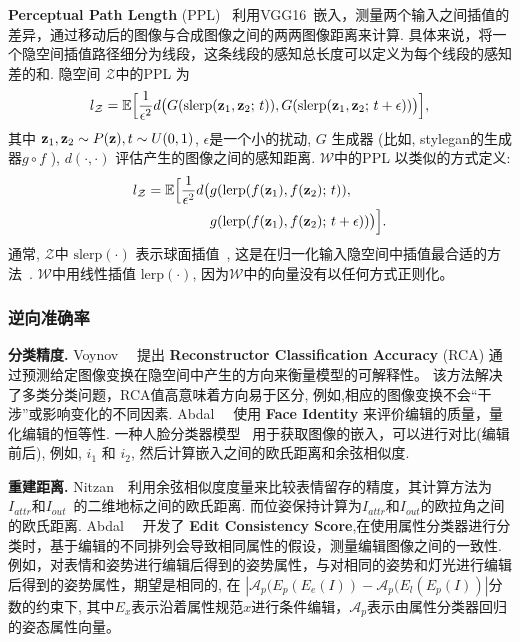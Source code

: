 \vspace{1mm}
\noindent\textbf{Perceptual Path Length} (PPL)~\cite{karras2019style} 利用VGG16~\cite{simonyan2014very}嵌入，测量两个输入之间插值的差异，通过移动后的图像与合成图像之间的两两图像距离来计算.
具体来说，将一个隐空间插值路径细分为线段，这条线段的感知总长度可以定义为每个线段的感知差的和.
隐空间 $\mathcal{Z}$中的PPL 为 
\begin{equation}
l_{\mathcal{Z}} = \mathbb{E}\Big[{\displaystyle\frac{1}{\epsilon^2}}d\big(G(\mathrm{slerp}({\mathbf{z}}_1,{\mathbf{z}}_2;\,t)), G(\mathrm{slerp}({\mathbf{z}}_1,{\mathbf{z}}_2;\,t+\epsilon))\big)\Big],
\end{equation}
其中 \mbox{${\mathbf{z}}_1,\mathbf{z}_2\sim P(\mathbf{z}),t\sim U(0,1)$}, $\epsilon$是一个小的扰动, $G$ 生成器 (比如, stylegan的生成器$g \circ f$ ),  $d(\cdot,\cdot)$ 评估产生的图像之间的感知距离. 
 $\mathcal{W}$中的PPL 以类似的方式定义:
\begin{equation}
\begin{aligned}
l_{\mathcal{Z}} = \mathbb{E}\Big[{\displaystyle\frac{1}{\epsilon^2}}d\big(&g(\mathrm{lerp}(f(\mathbf{z}_1),f(\mathbf{z}_2);\,t)), \\
&g(\mathrm{lerp}(f(\mathbf{z}_1),f(\mathbf{z}_2);\,t+\epsilon))\big)\Big].
\end{aligned}
\end{equation}
通常, $\mathcal{Z}$中 $\mathrm{slerp}(\cdot)$ 表示球面插值~\cite{shoemake1985animating}, 这是在归一化输入隐空间中插值最合适的方法~\cite{white2016sampling}.
 $\mathcal{W}$中用线性插值 $\mathrm{lerp}(\cdot)$, 因为$\mathcal{W}$中的向量没有以任何方式正则化。

\subsubsection{逆向准确率}
\noindent\textbf{分类精度.}
Voynov~\etal~\cite{voynov2020latent} 提出 \textbf{Reconstructor Classification Accuracy} (RCA) 通过预测给定图像变换在隐空间中产生的方向来衡量模型的可解释性。
该方法解决了多类分类问题，RCA值高意味着方向易于区分, 例如,相应的图像变换不会“干涉”或影响变化的不同因素.
Abdal~\etal~\cite{abdal2020styleflow} 使用 \textbf{Face Identity} 来评价编辑的质量，量化编辑的恒等性. 
一种人脸分类器模型~\cite{Geitgey2020Fr} 用于获取图像的嵌入，可以进行对比(编辑前后), 例如, $i_1$ 和 $i_2$, 然后计算嵌入之间的欧氏距离和余弦相似度.\par

\vspace{1mm}
\noindent\textbf{重建距离.}
Nitzan~\etal~\cite{nitzan2020harness}利用余弦相似度度量来比较表情留存的精度，其计算方法为$I_{attr}$和$I_{out}$~\cite{dlib2009}的二维地标之间的欧氏距离. 而位姿保持计算为$I_{attr}$和$I_{out}$的欧拉角之间的欧氏距离.
Abdal~\etal~\cite{abdal2020styleflow} 开发了 \textbf{Edit Consistency Score},在使用属性分类器进行分类时，基于编辑的不同排列会导致相同属性的假设，测量编辑图像之间的一致性.
例如，对表情和姿势进行编辑后得到的姿势属性，与对相同的姿势和灯光进行编辑后得到的姿势属性，期望是相同的, 在 $|\mathcal{A}_p(E_p(E_e(I))-\mathcal{A}_p(E_l(E_p(I))|$分数的约束下, 其中$E_x$表示沿着属性规范$x$进行条件编辑，$\mathcal{A}_p$表示由属性分类器回归的姿态属性向量。